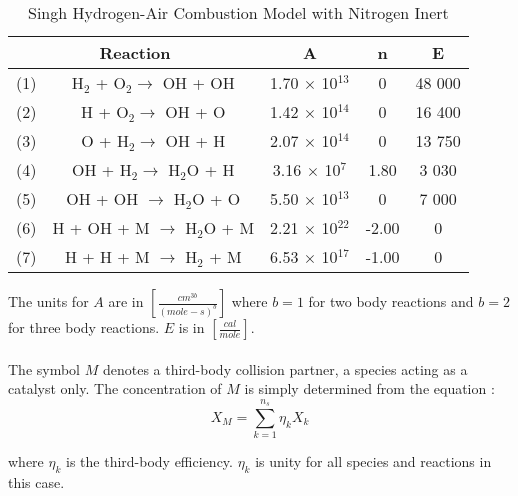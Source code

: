 \begin{table}
\begin{threeparttable}
\caption{Singh Hydrogen-Air Combustion Model with Nitrogen Inert}
\begin{tabular}{|cc|c|c|c|} \hline
\multicolumn{2}{|c|}{Reaction} & A & n & E  \\ \hline \hline
(1) & H$_{2}$ + O$_{2} \rightarrow$ OH + OH & 1.70 $\times$ 10$^{13}$ & 0 & 48 000 \\
(2) & H + O$_{2} \rightarrow$ OH + O & 1.42 $\times$ 10$^{14}$ & 0 & 16 400 \\
(3) & O + H$_{2} \rightarrow$ OH + H & 2.07 $\times$ 10$^{14}$ & 0 & 13 750 \\
(4) & OH + H$_{2} \rightarrow$ H$_{2}$O + H & 3.16 $\times$ 10$^{7}$ & 1.80 & 3 030 \\
(5) & OH + OH $\rightarrow$ H$_{2}$O + O & 5.50 $\times$ 10$^{13}$ & 0 & 7 000 \\
(6) & H + OH + M $\rightarrow$ H$_{2}$O + M & 2.21 $\times$ 10$^{22}$ & -2.00 & 0 \\
(7) & H + H + M $\rightarrow$ H$_{2}$ + M & 6.53 $\times$ 10$^{17}$ & -1.00 & 0 \\
\hline
\end{tabular}
\label{model}
\end{threeparttable}
\end{table}

The units for $A$ are in $[\frac{cm^{3b}}{(mole-s)^b}]$ where $b=1$ for two body reactions and 
$b=2$ for three body reactions. $E$ is in $[\frac{cal}{mole}]$.\\
\\

The symbol $M$ denotes a third-body collision partner, a species acting as a catalyst only.
The concentration of $M$ is simply determined from the equation :\\

\begin{displaymath}
X_M = \sum_{k=1}^{n_s} \eta_k X_k
\end{displaymath}

where $\eta_k$ is the third-body efficiency. $\eta_k$ is unity
for all species and reactions in this case. 

